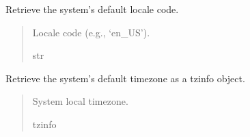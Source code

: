\documentclass[letterpaper,10pt,english]{sphinxmanual}
\begin{document}

\begin{fulllineitems}
\label{\detokenize{apache_commons_validator_python.util:apache_commons_validator_python.util.datetime_helpers.get_default_locale}}
\pysigstartsignatures
{}
\pysigstopsignatures
\sphinxAtStartPar
Retrieve the system’s default locale code.
\begin{quote}\begin{description}
\sphinxAtStartPar
Locale code (e.g., ‘en\_US’).

\sphinxAtStartPar
str

\end{description}\end{quote}

\end{fulllineitems}


\begin{fulllineitems}
\label{\detokenize{apache_commons_validator_python.util:apache_commons_validator_python.util.datetime_helpers.get_default_tzinfo}}
\pysigstartsignatures
{}
\pysigstopsignatures
\sphinxAtStartPar
Retrieve the system’s default timezone as a tzinfo object.
\begin{quote}\begin{description}
\sphinxAtStartPar
System local timezone.

\sphinxAtStartPar
tzinfo

\end{description}\end{quote}

\end{fulllineitems}
\end{document}

